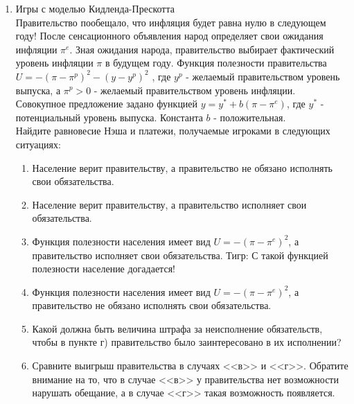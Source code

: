 \documentclass[pdftex,12pt,a4paper]{article}
\begin{document}
\begin{enumerate}
\item Игры с моделью Кидленда-Прескотта \\
Правительство пообещало, что инфляция будет равна нулю в следующем году! После сенсационного объявления народ определяет свои ожидания инфляции $\pi ^e $. Зная ожидания народа, правительство выбирает фактический уровень инфляции $\pi $ в будущем году. Функция полезности правительства $U =  - \left( {\pi  - \pi ^p } \right)^2  - \left( {y - y^p } \right)^2 $
, где $y^p $ - желаемый правительством уровень выпуска, а $\pi ^p  > 0$ - желаемый правительством уровень инфляции. \\
Совокупное предложение задано функцией $y = y^{*}  + b\left( {\pi  - \pi ^e } \right)$, где $y^{*}$ - потенциальный уровень выпуска. Константа $b$ - положительная.\\
Найдите равновесие Нэша и платежи, получаемые игроками в следующих ситуациях:
\begin{enumerate}
\item Население верит правительству, а правительство не обязано исполнять свои обязательства.
\item Население верит правительству, а правительство исполняет свои обязательства.
\item Функция полезности населения имеет вид $U =  - \left( {\pi  - \pi ^e } \right)^2 $, а правительство исполняет свои обязательства. Тигр: С такой функцией полезности население догадается!
\item Функция полезности населения имеет вид $U =  - \left( {\pi  - \pi ^e } \right)^2 $, а правительство не обязано исполнять свои обязательства.
\item Какой должна быть величина штрафа за неисполнение обязательств, чтобы в пункте г) правительство было заинтересовано в их исполнении?
\item Сравните выигрыш правительства в случаях <<в>> и <<г>>. Обратите внимание на то, что в случае <<в>> у правительства нет возможности нарушать обещание, а в случае <<г>> такая возможность появляется.
\end{enumerate}


\end{enumerate}
\end{document}
